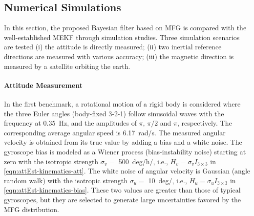 \subsection{Numerical Simulations}

In this section, the proposed Bayesian filter based on MFG is compared with the well-established MEKF through simulation studies.
Three simulation scenarios are tested (i) the attitude is directly measured;
(ii) two inertial reference directions are measured with various accuracy;
(iii) the magnetic direction is measured by a satellite orbiting the earth.

\paragraph{Attitude Measurement}

In the first benchmark, a rotational motion of a rigid body is considered where the three Euler angles (body-fixed 3-2-1) follow sinusoidal waves with the frequency at \SI{0.35}{\hertz}, and the amplitudes of $\pi$, $\pi/2$ and $\pi$, respectively.
The corresponding average angular speed is \SI{6.17}{\radian/\second}.
The measured angular velocity is obtained from its true value by adding a bias and a white noise.
The gyroscope bias is modeled as a Wiener process (bias-instability noise) starting at zero with the isotropic strength $\sigma_v = $ \SI{500}{deg/\hour/\sqrt{\second}}, i.e., $H_v = \sigma_vI_{3\times3}$ in \eqref{eqn:attEst-kinematics-att}.
The white noise of angular velocity is Gaussian (angle random walk) with the isotropic strength $\sigma_u = $ \SI{10}{deg/\sqrt{\second}}, i.e., $H_u = \sigma_uI_{3\times3}$ in \eqref{eqn:attEst-kinematics-bias}.
These two values are greater than those of typical gyroscopes, but they are selected to generate large uncertainties favored by the MFG distribution.

